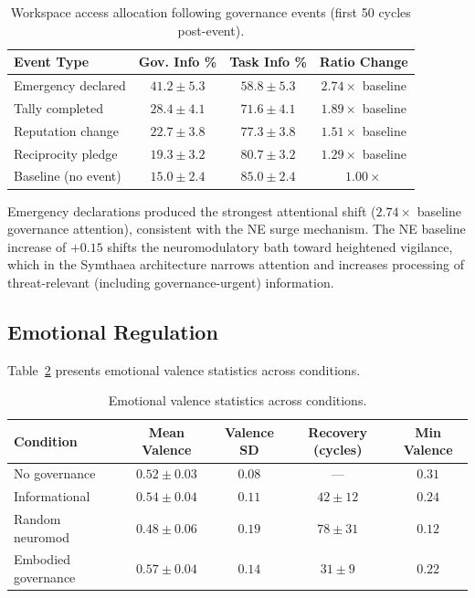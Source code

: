 \documentclass[11pt,a4paper]{article}
\begin{document}
\begin{table}[h]
\centering
\caption{Workspace access allocation following governance events (first 50 cycles post-event).}
\label{tab:attention}
\begin{tabular}{lccc}
\toprule
\textbf{Event Type} & \textbf{Gov. Info \%} & \textbf{Task Info \%} & \textbf{Ratio Change} \\
\midrule
Emergency declared   & $41.2 \pm 5.3$ & $58.8 \pm 5.3$ & $2.74\times$ baseline \\
Tally completed      & $28.4 \pm 4.1$ & $71.6 \pm 4.1$ & $1.89\times$ baseline \\
Reputation change    & $22.7 \pm 3.8$ & $77.3 \pm 3.8$ & $1.51\times$ baseline \\
Reciprocity pledge   & $19.3 \pm 3.2$ & $80.7 \pm 3.2$ & $1.29\times$ baseline \\
Baseline (no event)  & $15.0 \pm 2.4$ & $85.0 \pm 2.4$ & $1.00\times$ \\
\bottomrule
\end{tabular}
\end{table}

Emergency declarations produced the strongest attentional shift ($2.74\times$ baseline governance attention), consistent with the NE surge mechanism.
The NE baseline increase of $+0.15$ shifts the neuromodulatory bath toward heightened vigilance, which in the Symthaea architecture narrows attention and increases processing of threat-relevant (including governance-urgent) information.

\subsection{Emotional Regulation}

Table~\ref{tab:emotion} presents emotional valence statistics across conditions.

\begin{table}[h]
\centering
\caption{Emotional valence statistics across conditions.}
\label{tab:emotion}
\begin{tabular}{lcccc}
\toprule
\textbf{Condition} & \textbf{Mean Valence} & \textbf{Valence SD} & \textbf{Recovery (cycles)} & \textbf{Min Valence} \\
\midrule
No governance       & $0.52 \pm 0.03$ & $0.08$ & --- & $0.31$ \\
Informational       & $0.54 \pm 0.04$ & $0.11$ & $42 \pm 12$ & $0.24$ \\
Random neuromod     & $0.48 \pm 0.06$ & $0.19$ & $78 \pm 31$ & $0.12$ \\
Embodied governance & $0.57 \pm 0.04$ & $0.14$ & $31 \pm 9$ & $0.22$ \\
\bottomrule
\end{tabular}
\end{table}
\end{document}

